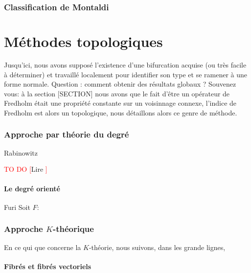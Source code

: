 \documentclass[a4paper,12pt,oneside,titlepage]{article}
\newcommand{\todo}[1]{\textcolor{red}{TO DO [}#1\textcolor{red}{]}}
\theoremstyle{definition}
\theoremstyle{plain}
\begin{document}
\section{Classification de Montaldi}



\newpage

\part{Méthodes topologiques}

Jusqu'ici, nous avons supposé l'existence d'une bifurcation acquise (ou très facile à déterminer) et travaillé localement pour identifier son type et se ramener à une forme normale. Question : comment obtenir des résultats globaux ? Souvenez vous: à la section [SECTION] nous avons que le fait d'être un opérateur de Fredholm était une propriété constante sur un voisinnage connexe, l'indice de Fredholm est alors un  topologique, nous détaillons alors ce genre de méthode.

\section{Approche par théorie du degré}

\begin{theobox}{Rabinowitz}{}
    
\end{theobox}


\todo{Lire \cite{Feckan2008Topological}}

\subsection{Le degré orienté}

\begin{theobox}{Furi}{}
    Soit $F: $
\end{theobox}

\section{Approche $K$-théorique}\label{K-th}

En ce qui que concerne la $K$-théorie, nous suivons, dans les grande lignes, \cite{Karoubi1978KTheory}


\subsection{Fibrés et fibrés vectoriels}
\end{document}
